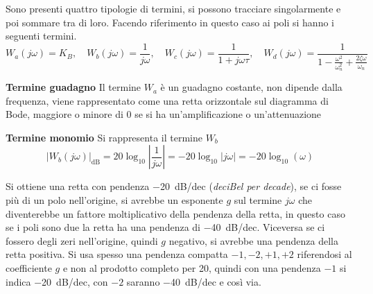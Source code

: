 Sono presenti quattro tipologie di termini, si possono tracciare singolarmente
e poi sommare tra di loro.
Facendo riferimento in questo caso ai poli si hanno i seguenti termini.
$$
W_a(j\omega) = K_B,\quad W_b(j\omega)=\frac{1}{j\omega},\quad W_c(j\omega)=
\frac{1}{1+j\omega\tau},\quad
W_d(j\omega)=\frac{1}{1-\frac{\omega^2}{\omega_n^2}+\frac{2\zeta\omega}{\omega_n
} }
$$

\textbf{Termine guadagno}
Il termine $W_a$ è un guadagno costante, non dipende dalla frequenza, viene
rappresentato come una retta orizzontale sul diagramma di Bode, maggiore o
minore di 0 se si ha un'amplificazione o un'attenuazione
\begin{figure}[h]
\centering
{}
\end{figure}

\textbf{Termine monomio}
Si rappresenta il termine $W_b$
$$
|W_b(j\omega)|_{\si{\deci\bel}} = 20\log_{10}\left|\frac{1}{j\omega}\right| =
-20\log_{10} |j\omega| = -20 \log_{10} (\omega)
$$
\begin{figure}[h]
\centering
{}
\end{figure}
Si ottiene una retta con pendenza \SI{-20}{\deci\bel/dec} (\textit{deciBel per
decade}), se ci fosse più di un polo nell'origine, si avrebbe un esponente $g$
sul termine $j\omega$ che diventerebbe un fattore moltiplicativo della pendenza
della retta, in questo caso se i poli sono due la retta ha una pendenza di
\SI{-40}{\deci\bel/dec}.
Viceversa se ci fossero degli zeri nell'origine, quindi $g$ negativo, si
avrebbe una pendenza della retta positiva.
Si usa spesso una pendenza compatta $-1,-2,+1,+2$ riferendosi al coefficiente
$g$ e non al prodotto completo per 20, quindi con una pendenza $-1$ si indica
\SI{-20}{\deci\bel/dec}, con $-2$ saranno \SI{-40}{\deci\bel/dec} e così via.

